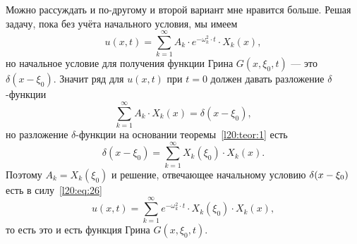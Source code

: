 Можно рассуждать и по-другому и второй вариант мне нравится больше. Решая задачу, пока без учёта начального условия, мы имеем
\begin{equation}\label{l20:eq:26}
	u(x,t)=\sum\limits_{k=1}^{\infty}A_k\cdot e^{-\omega_k^2\cdot t}\cdot X_k(x),
\end{equation}
но начальное условие для получения функции Грина $G(x,\xi_0,t)$ --- это $\delta(x-\xi_0)$. Значит ряд для $u(x,t)$ при $t=0$ должен давать разложение $\delta$-функции
\begin{equation*}
	\sum\limits_{k=1}^{\infty}A_k\cdot X_k(x)=\delta(x-\xi_0),
\end{equation*}
но разложение $\delta$-функции на основании теоремы~\ref{l20:teor:1} есть
\begin{equation*}
	\delta(x-\xi_0)=\sum\limits_{k=1}^{\infty}X_k(\xi_0)\cdot X_k(x).
\end{equation*}
Поэтому $A_k=X_k(\xi_0)$ и решение, отвечающее начальному условию $\delta(x\?-\xi_0)$ есть в силу~\eqref{l20:eq:26}
\begin{equation*}
	u(x,t)=\sum\limits_{k=1}^{\infty}e^{-\omega_k^2\cdot t}\cdot X_k(\xi_0)\cdot X_k(x),
\end{equation*}
то есть это и есть функция Грина $G(x,\xi_0,t)$.